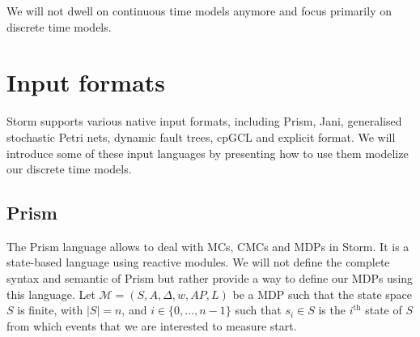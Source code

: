 We will not dwell on continuous time models anymore and focus primarily on discrete time models.

\section{Input formats}
Storm supports various native input formats, including Prism, Jani, generalised stochastic Petri nets, dynamic fault trees, cpGCL and explicit format.
We will introduce some of these input languages by presenting how to use them modelize our
discrete time models.
\subsection{Prism}
The Prism language allows to deal with MCs, CMCs and MDPs in Storm.
It is a state-based language using reactive modules.
We will not define the complete syntax and semantic of Prism but rather provide a way to
define our MDPs using this language. Let $\mathcal{M} = (S, A, \Delta, w, AP, L)$ be a MDP such that the state space
$S$ is finite, with $|S| = n$, and $i \in \{0, \dots, n-1\}$ such that $s_i \in S$ is the $i^{\text{th}}$ state of $S$ from which events that we are
interested to measure start. \\

